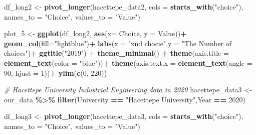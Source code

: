 \documentclass[
]{article}
\newenvironment{Shaded}{\begin{snugshade}}{\end{snugshade}}
\newcommand{\AttributeTok}[1]{\textcolor[rgb]{0.13,0.29,0.53}{#1}}
\newcommand{\CommentTok}[1]{\textcolor[rgb]{0.56,0.35,0.01}{\textit{#1}}}
\newcommand{\DecValTok}[1]{\textcolor[rgb]{0.00,0.00,0.81}{#1}}
\newcommand{\FunctionTok}[1]{\textcolor[rgb]{0.13,0.29,0.53}{\textbf{#1}}}
\newcommand{\NormalTok}[1]{#1}
\newcommand{\OtherTok}[1]{\textcolor[rgb]{0.56,0.35,0.01}{#1}}
\newcommand{\SpecialCharTok}[1]{\textcolor[rgb]{0.81,0.36,0.00}{\textbf{#1}}}
\newcommand{\StringTok}[1]{\textcolor[rgb]{0.31,0.60,0.02}{#1}}
\begin{document}
\begin{Shaded}
\begin{Highlighting}[]
\NormalTok{df\_long2 }\OtherTok{\textless{}{-}} \FunctionTok{pivot\_longer}\NormalTok{(hacettepe\_data2, }\AttributeTok{cols =} \FunctionTok{starts\_with}\NormalTok{(}\StringTok{"choice"}\NormalTok{),}
                        \AttributeTok{names\_to =} \StringTok{"Choice"}\NormalTok{, }\AttributeTok{values\_to =} \StringTok{"Value"}\NormalTok{)}

\NormalTok{plot\_5 }\OtherTok{\textless{}{-}} \FunctionTok{ggplot}\NormalTok{(df\_long2, }\FunctionTok{aes}\NormalTok{(}\AttributeTok{x=}\NormalTok{ Choice, }\AttributeTok{y =}\NormalTok{ Value))}\SpecialCharTok{+}
   \FunctionTok{geom\_col}\NormalTok{(}\AttributeTok{fill=}\StringTok{"lightblue"}\NormalTok{)}\SpecialCharTok{+}
  \FunctionTok{labs}\NormalTok{(}\AttributeTok{x =} \StringTok{"xnd chocie"}\NormalTok{,}\AttributeTok{y =} \StringTok{"The Number of choices"}\NormalTok{)}\SpecialCharTok{+}
  \FunctionTok{ggtitle}\NormalTok{(}\StringTok{"2019"}\NormalTok{) }\SpecialCharTok{+}
  \FunctionTok{theme\_minimal}\NormalTok{() }\SpecialCharTok{+}
  \FunctionTok{theme}\NormalTok{(}\AttributeTok{axis.title =} \FunctionTok{element\_text}\NormalTok{(}\AttributeTok{color =} \StringTok{"blue"}\NormalTok{))}\SpecialCharTok{+}
  \FunctionTok{theme}\NormalTok{(}\AttributeTok{axis.text.x =} \FunctionTok{element\_text}\NormalTok{(}\AttributeTok{angle =} \DecValTok{90}\NormalTok{, }\AttributeTok{hjust =} \DecValTok{1}\NormalTok{))}\SpecialCharTok{+}
  \FunctionTok{ylim}\NormalTok{(}\FunctionTok{c}\NormalTok{(}\DecValTok{0}\NormalTok{, }\DecValTok{220}\NormalTok{))}


\CommentTok{\# Hacettepe University Industrial Engineering data in 2020}
\NormalTok{hacettepe\_data3 }\OtherTok{\textless{}{-}}\NormalTok{ our\_data }\SpecialCharTok{\%\textgreater{}\%} \FunctionTok{filter}\NormalTok{(University }\SpecialCharTok{==} \StringTok{"Hacettepe University"}\NormalTok{,Year }\SpecialCharTok{==} \DecValTok{2020}\NormalTok{)}


\NormalTok{df\_long3 }\OtherTok{\textless{}{-}} \FunctionTok{pivot\_longer}\NormalTok{(hacettepe\_data3, }\AttributeTok{cols =} \FunctionTok{starts\_with}\NormalTok{(}\StringTok{"choice"}\NormalTok{),}
                         \AttributeTok{names\_to =} \StringTok{"Choice"}\NormalTok{, }\AttributeTok{values\_to =} \StringTok{"Value"}\NormalTok{)}


\end{Highlighting}
\end{Shaded}
\end{document}
